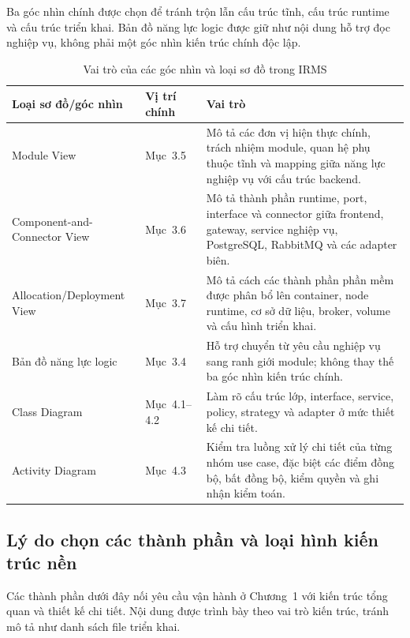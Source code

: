 Ba góc nhìn chính được chọn để tránh trộn lẫn cấu trúc tĩnh, cấu trúc runtime và cấu trúc triển khai. Bản đồ năng lực logic được giữ như nội dung hỗ trợ đọc nghiệp vụ, không phải một góc nhìn kiến trúc chính độc lập.

\begin{table}[H]
\centering
\caption{Vai trò của các góc nhìn và loại sơ đồ trong IRMS}
\label{tab:appendix-view-rationale}
\small
\begin{tabularx}{\textwidth}{|p{3.5cm}|p{3.1cm}|X|}
\hline
\textbf{Loại sơ đồ/góc nhìn} & \textbf{Vị trí chính} & \textbf{Vai trò} \\
\hline
Module View & Mục~3.5 & Mô tả các đơn vị hiện thực chính, trách nhiệm module, quan hệ phụ thuộc tĩnh và mapping giữa năng lực nghiệp vụ với cấu trúc backend. \\
\hline
Component-and-Connector View & Mục~3.6 & Mô tả thành phần runtime, port, interface và connector giữa frontend, gateway, service nghiệp vụ, PostgreSQL, RabbitMQ và các adapter biên. \\
\hline
Allocation/Deployment View & Mục~3.7 & Mô tả cách các thành phần phần mềm được phân bổ lên container, node runtime, cơ sở dữ liệu, broker, volume và cấu hình triển khai. \\
\hline
Bản đồ năng lực logic & Mục~3.4 & Hỗ trợ chuyển từ yêu cầu nghiệp vụ sang ranh giới module; không thay thế ba góc nhìn kiến trúc chính. \\
\hline
Class Diagram & Mục~4.1--4.2 & Làm rõ cấu trúc lớp, interface, service, policy, strategy và adapter ở mức thiết kế chi tiết. \\
\hline
Activity Diagram & Mục~4.3 & Kiểm tra luồng xử lý chi tiết của từng nhóm use case, đặc biệt các điểm đồng bộ, bất đồng bộ, kiểm quyền và ghi nhận kiểm toán. \\
\hline
\end{tabularx}
\normalsize
\end{table}

\subsection{Lý do chọn các thành phần và loại hình kiến trúc nền}\label{appendix:component-rationale}

Các thành phần dưới đây nối yêu cầu vận hành ở Chương~1 với kiến trúc tổng quan và thiết kế chi tiết. Nội dung được trình bày theo vai trò kiến trúc, tránh mô tả như danh sách file triển khai.

